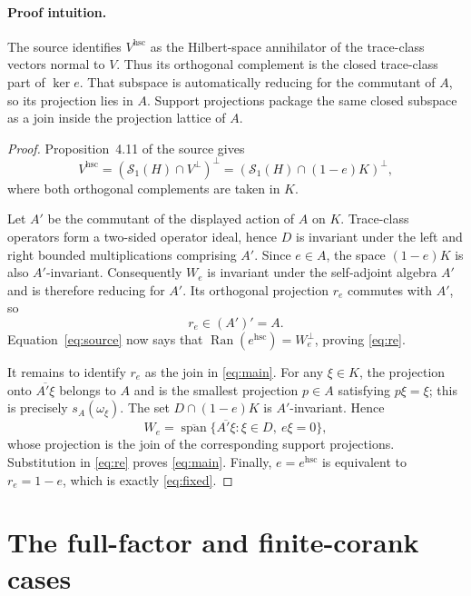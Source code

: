 \documentclass[11pt]{article}
\newcommand{\TC}{\mathcal S_1}
\newcommand{\ran}{\operatorname{Ran}}
\begin{document}
\paragraph{Proof intuition.}
The source identifies $V^{\mathrm{hsc}}$ as the Hilbert-space annihilator
of the trace-class vectors normal to $V$.  Thus its orthogonal complement
is the closed trace-class part of $\ker e$.  That subspace is automatically
reducing for the commutant of $A$, so its projection lies in $A$.  Support
projections package the same closed subspace as a join inside the projection
lattice of $A$.

\begin{proof}
Proposition~4.11 of the source gives
\begin{equation}\label{eq:source}
 V^{\mathrm{hsc}}=(\TC(H)\cap V^\perp)^\perp
                 =(\TC(H)\cap(1-e)K)^\perp,
\end{equation}
where both orthogonal complements are taken in $K$.

Let $A'$ be the commutant of the displayed action of $A$ on $K$.
Trace-class operators form a two-sided operator ideal, hence $D$ is
invariant under the left and right bounded multiplications comprising
$A'$.  Since $e\in A$, the space $(1-e)K$ is also $A'$-invariant.
Consequently $W_e$ is invariant under the self-adjoint algebra $A'$ and is
therefore reducing for $A'$.  Its orthogonal projection $r_e$ commutes with
$A'$, so
\[
                         r_e\in(A')'=A.
\]
Equation~\eqref{eq:source} now says that
$\ran(e^{\mathrm{hsc}})=W_e^\perp$, proving
\eqref{eq:re}.

It remains to identify $r_e$ as the join in \eqref{eq:main}.  For any
$\xi\in K$, the projection onto $\overline{A'\xi}$ belongs to $A$ and is
the smallest projection $p\in A$ satisfying $p\xi=\xi$; this is precisely
$s_A(\omega_\xi)$.  The set
$D\cap(1-e)K$ is $A'$-invariant.  Hence
\[
 W_e=\overline{\operatorname{span}}
       \{\overline{A'\xi}:\xi\in D,\ e\xi=0\},
\]
whose projection is the join of the corresponding support projections.
Substitution in \eqref{eq:re} proves \eqref{eq:main}.  Finally,
$e=e^{\mathrm{hsc}}$ is equivalent to $r_e=1-e$, which is exactly
\eqref{eq:fixed}.
\end{proof}

\section{The full-factor and finite-corank cases}
\end{document}
